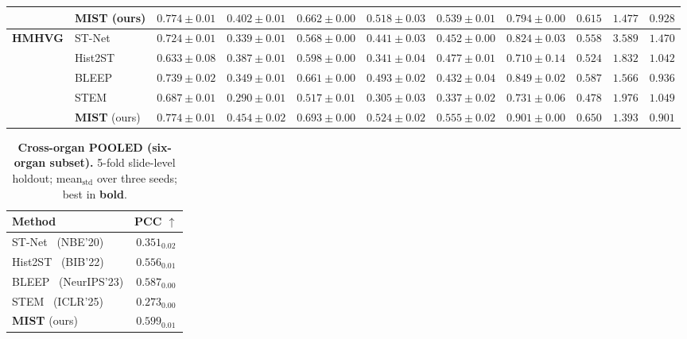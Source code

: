 \documentclass[11pt]{article}
\newcommand{\morph}{\textbf{MIST}}
\newcommand{\best}[1]{{\bfseries\boldmath #1}}
\begin{document}
\begin{table}[t]
{\begin{tabular}{llrrrrrrrrr}
 & \morph{} (ours) & \best{$0.774{\pm}0.01$} & \best{$0.402{\pm}0.01$} & \best{$0.662{\pm}0.00$} & \best{$0.518{\pm}0.03$} & \best{$0.539{\pm}0.01$} & \best{$0.794{\pm}0.00$} & \best{$0.615$} & \best{$1.477$} & \best{$0.928$} \\
\midrule
\multirow{5}{*}{\textbf{HMHVG}} & ST-Net & $0.724{\pm}0.01$ & $0.339{\pm}0.01$ & $0.568{\pm}0.00$ & $0.441{\pm}0.03$ & $0.452{\pm}0.00$ & $0.824{\pm}0.03$ & $0.558$ & $3.589$ & $1.470$ \\
 & Hist2ST & $0.633{\pm}0.08$ & $0.387{\pm}0.01$ & $0.598{\pm}0.00$ & $0.341{\pm}0.04$ & $0.477{\pm}0.01$ & $0.710{\pm}0.14$ & $0.524$ & $1.832$ & $1.042$ \\
 & BLEEP & $0.739{\pm}0.02$ & $0.349{\pm}0.01$ & $0.661{\pm}0.00$ & $0.493{\pm}0.02$ & $0.432{\pm}0.04$ & $0.849{\pm}0.02$ & $0.587$ & $1.566$ & $0.936$ \\
 & STEM & $0.687{\pm}0.01$ & $0.290{\pm}0.01$ & $0.517{\pm}0.01$ & $0.305{\pm}0.03$ & $0.337{\pm}0.02$ & $0.731{\pm}0.06$ & $0.478$ & $1.976$ & $1.049$ \\
 & \morph{} (ours) & \best{$0.774{\pm}0.01$} & \best{$0.454{\pm}0.02$} & \best{$0.693{\pm}0.00$} & \best{$0.524{\pm}0.02$} & \best{$0.555{\pm}0.02$} & \best{$0.901{\pm}0.00$} & \best{$0.650$} & \best{$1.393$} & \best{$0.901$} \\
\bottomrule
\end{tabular}%
}
\end{table}

\setcounter{table}{1}

\FloatBarrier


\begin{table}[!ht]
\centering
\caption{\textbf{Cross-organ POOLED (six-organ subset).} 5-fold slide-level holdout; mean$_{\text{std}}$ over three seeds; best in \best{bold}.}
\label{tab:pooled6}
{\small
\setlength{\tabcolsep}{6pt}
\begin{tabular}{l c}
\toprule
Method & PCC $\uparrow$ \\
\midrule
ST-Net~\cite{he2020stnet} (NBE'20)       & $0.351_{0.02}$ \\
Hist2ST~\cite{zeng2022hist2st} (BIB'22)     & $0.556_{0.01}$ \\
BLEEP~\cite{xie2023bleep} (NeurIPS'23)       & $0.587_{0.00}$ \\
STEM~\cite{zhu2025diffusion} (ICLR'25)             & $0.273_{0.00}$ \\
\midrule
\morph{} (ours)                          & \best{$0.599_{0.01}$} \\
\bottomrule
\end{tabular}
}
\end{table}
\end{document}
